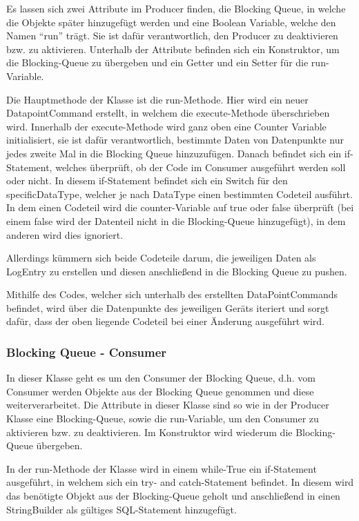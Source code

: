 Es lassen sich zwei Attribute im Producer finden, die Blocking Queue, in welche die Objekte später hinzugefügt werden und eine Boolean Variable, welche den Namen “run” trägt. Sie ist dafür verantwortlich, den Producer zu deaktivieren bzw. zu aktivieren. Unterhalb der Attribute befinden sich ein Konstruktor, um die Blocking-Queue zu übergeben und ein Getter und ein Setter für die run-Variable. 

Die Hauptmethode der Klasse ist die run-Methode. Hier wird ein neuer DatapointCommand erstellt, in welchem die execute-Methode überschrieben wird. Innerhalb der execute-Methode wird ganz oben eine Counter Variable initialisiert, sie ist dafür verantwortlich, bestimmte Daten von Datenpunkte nur jedes zweite Mal in die Blocking Queue hinzuzufügen. Danach befindet sich ein if-Statement, welches überprüft, ob der Code im Consumer ausgeführt werden soll oder nicht. In diesem if-Statement befindet sich ein Switch für den specificDataType, welcher je nach DataType einen bestimmten Codeteil ausführt. In dem einen Codeteil wird die counter-Variable auf true oder false überprüft (bei einem false wird der Datenteil nicht in die Blocking-Queue hinzugefügt), in dem anderen wird dies ignoriert.

Allerdings kümmern sich beide Codeteile darum, die jeweiligen Daten als LogEntry zu erstellen und diesen anschließend in die Blocking Queue zu pushen.

Mithilfe des Codes, welcher sich unterhalb des erstellten DataPointCommands befindet, wird über die Datenpunkte des jeweiligen Geräts iteriert und sorgt dafür, dass der oben liegende Codeteil bei einer Änderung ausgeführt wird.  

\subsubsection{Blocking Queue - Consumer }
In dieser Klasse geht es um den Consumer der Blocking Queue, d.h. vom Consumer werden Objekte aus der Blocking Queue genommen und diese weiterverarbeitet. Die Attribute in dieser Klasse sind so wie in der Producer Klasse eine Blocking-Queue, sowie die run-Variable, um den Consumer zu aktivieren bzw. zu deaktivieren. Im Konstruktor wird wiederum die Blocking-Queue übergeben.

In der run-Methode der Klasse wird in einem while-True ein if-Statement ausgeführt, in welchem sich ein try- and catch-Statement befindet. In diesem wird das benötigte Objekt aus der Blocking-Queue geholt und anschließend in einen StringBuilder als gültiges SQL-Statement hinzugefügt.

